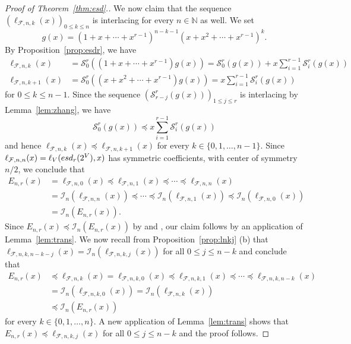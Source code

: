 \documentclass[11pt]{amsart}
\newcommand{\esd}{{\rm esd}}
\newcommand{\fF}{{\mathcal F}}
\newcommand{\iI}{{\mathcal I}}
\newcommand{\sS}{{\mathcal S}}
\newcommand{\NN}{{\mathbb N}}
\begin{document}
\begin{proof}[Proof of Theorem~\ref{thm:esd}.]
We now claim that the sequence 
$(\ell_{\fF,n,k}(x))_{0 \le k \le n}$ is 
interlacing for every $n \in \NN$ as well. 
We set 
%
\[ g(x) = (1 + x + \cdots + x^{r-1})^{n-k-1} 
   (x + x^2 + \cdots + x^{r-1})^k. \]
%
By Proposition~\ref{prop:esdr}, we have 
%
\begin{align*}
  \ell_{\fF,n,k}(x) & = \sS^r_0 \left( 
  (1 + x + \cdots + x^{r-1}) g(x) \right) = 
	\sS^r_0 (g(x)) + x \sum_{i=1}^{r-1} \sS^r_i 
	(g(x)) \\ 
	\ell_{\fF,n,k+1}(x) & = \sS^r_0 \left( 
  (x + x^2 + \cdots + x^{r-1}) g(x) \right) = 
	x \sum_{i=1}^{r-1} \sS^r_i (g(x))
\end{align*}
%
for $0 \le k \le n-1$. Since the sequence 
$(\sS^r_{r-j} (g(x)))_{1 \le j \le r}$ is 
interlacing by Lemma~\ref{lem:zhang}, we have 
%
\[ \sS^r_0 (g(x)) \preceq x \sum_{i=1}^{r-1} 
   \sS^r_i (g(x)) \]
%
and hence $\ell_{\fF,n,k}(x) \preceq
\ell_{\fF,n,k+1}(x)$ for every $k \in \{0, 
1,\dots,n-1\}$. Since $\ell_{\fF,n,n}(x) = \ell_V
(\esd_r(2^V),x)$ has symmetric coefficients, with 
center of symmetry $n/2$, we conclude that 
%
\begin{align*} 
E_{n,r}(x) & = \ell_{\fF,n,0}(x) \preceq 
\ell_{\fF,n,1}(x) \preceq \cdots \preceq 
\ell_{\fF,n,n}(x) \\ & = \iI_n (\ell_{\fF,n,n}(x)) 
\preceq \cdots \preceq \iI_n (\ell_{\fF,n,1}(x)) 
\preceq \iI_n (\ell_{\fF,n,0}(x)) \\ 
       & = \iI_n(E_{n,r}(x)).
\end{align*}
% 
Since $E_{n,r}(x) \preceq \iI_n(E_{n,r}(x))$ by 
\cite[Corollary~7.3]{Ath22} and 
\cite[Theorem~2.7]{BS21}, our claim follows by an 
application of Lemma~\ref{lem:trans}. We now 
recall from Proposition~\ref{prop:lnkj} (b) that 
$\ell_{\fF, n,k,n-k-j}(x) = \iI_n 
(\ell_{\fF,n,k,j}(x))$ for all $0 \le j \le n-k$ 
and conclude that 
%
\begin{align*} 
E_{n,r}(x) & \preceq \ell_{\fF,n,k}(x) = 
\ell_{\fF,n,k,0}(x) \preceq \ell_{\fF,n,k,1}(x) 
\preceq \cdots \preceq \ell_{\fF,n,k,n-k}(x) \\ 
& = \iI_n (\ell_{\fF,n,k,0}(x)) = \iI_n 
(\ell_{\fF,n,k}(x)) \\ & \preceq \iI_n 
(E_{n,r}(x))
\end{align*}
% 
for every $k \in \{0, 1,\dots,n\}$. A new 
application of Lemma~\ref{lem:trans} shows that
$E_{n,r}(x) \preceq \ell_{\fF,n,k,j}(x)$ for all 
$0 \le j \le n-k$ and the proof follows.
\end{proof}
\end{document}
